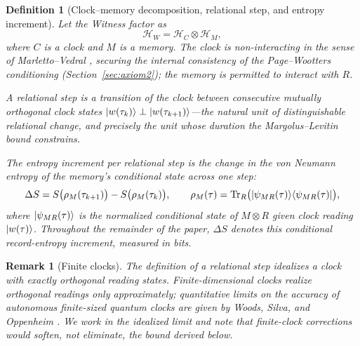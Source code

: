 \documentclass[11pt, a4paper]{article}
\newtheorem{definition}{Definition}
\newtheorem{remark}{Remark}
\begin{document}
\begin{definition}[Clock--memory decomposition, relational step, and entropy increment]
\label{def:clockmemory}
Let the Witness factor as
\begin{equation}
\mathcal{H}_W = \mathcal{H}_C \otimes \mathcal{H}_M,
\label{eq:CM}
\end{equation}
where $C$ is a clock and $M$ is a memory. The clock is non-interacting in the sense of Marletto--Vedral \cite{Marletto2017}, securing the internal consistency of the Page--Wootters conditioning (Section~\ref{sec:axiom2}); the memory is permitted to interact with $R$.

A \emph{relational step} is a transition of the clock between consecutive mutually orthogonal clock states $\ket{w(\tau_k)} \perp \ket{w(\tau_{k+1})}$---the natural unit of distinguishable relational change, and precisely the unit whose duration the Margolus--Levitin bound constrains.

The \emph{entropy increment per relational step} is the change in the von Neumann entropy of the memory's conditional state across one step:
\begin{equation}
\Delta S = S\bigl(\rho_M(\tau_{k+1})\bigr) - S\bigl(\rho_M(\tau_k)\bigr), \qquad
\rho_M(\tau) = \operatorname{Tr}_R\bigl(\ket{\psi_{MR}(\tau)}\!\bra{\psi_{MR}(\tau)}\bigr),
\label{eq:deltaS}
\end{equation}
where $\ket{\psi_{MR}(\tau)}$ is the normalized conditional state of $M \otimes R$ given clock reading $\ket{w(\tau)}$. Throughout the remainder of the paper, $\Delta S$ denotes this conditional record-entropy increment, measured in bits.
\end{definition}

\begin{remark}[Finite clocks]
The definition of a relational step idealizes a clock with exactly orthogonal reading states. Finite-dimensional clocks realize orthogonal readings only approximately; quantitative limits on the accuracy of autonomous finite-sized quantum clocks are given by Woods, Silva, and Oppenheim \cite{Woods2019}. We work in the idealized limit and note that finite-clock corrections would soften, not eliminate, the bound derived below.
\end{remark}
\end{document}
